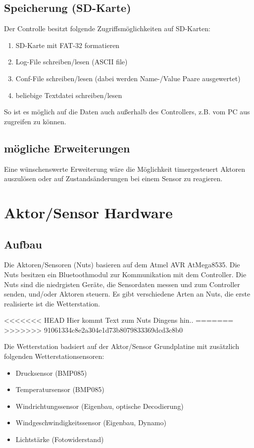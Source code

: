 \documentclass[12pt,a4paper]{article}
\begin{document}
\subsection{Speicherung (SD-Karte)}

Der Controlle besitzt folgende Zugriffsmöglichkeiten auf SD-Karten:

\begin{enumerate}
	\item SD-Karte mit FAT-32 formatieren
	\item Log-File schreiben/lesen (ASCII file)
	\item Conf-File schreiben/lesen (dabei werden Name-/Value Paare ausgewertet)
	\item beliebige Textdatei schreiben/lesen
\end{enumerate}

So ist es möglich auf die Daten auch außerhalb des Controllers, z.B. vom PC aus zugreifen zu können.

\subsection{mögliche Erweiterungen}
Eine wünschenswerte Erweiterung wäre die Möglichkeit timergesteuert Aktoren auszulösen oder auf Zustandsänderungen bei einem Sensor zu reagieren.

\section{Aktor/Sensor Hardware}

\subsection{Aufbau}

Die Aktoren/Sensoren (Nuts) basieren auf dem Atmel AVR AtMega8535. Die Nuts besitzen ein Bluetoothmodul zur Kommunikation mit dem Controller. Die Nuts sind die niedrgisten Geräte, die Sensordaten messen und zum Controller senden, und/oder Aktoren steuern.
Es gibt verschiedene Arten an Nuts, die erste realisierte ist die Wetterstation.

<<<<<<< HEAD
Hier kommt Text zum Nuts Dingens hin..
=======
>>>>>>> 91061334c8e2a304e1d73b8079833369dcd3c8b0

Die Wetterstation badsiert auf der Aktor/Sensor Grundplatine mit zusätzlich folgenden Wetterstationsensoren:

\begin{itemize}
	\item Drucksensor (BMP085)
	\item Temperatursensor (BMP085)
	\item Windrichtungssensor (Eigenbau, optische Decodierung)
	\item Windgeschwindigkeitssensor (Eigenbau, Dynamo)
	\item Lichtstärke (Fotowiderstand)
\end{itemize}
\end{document}
